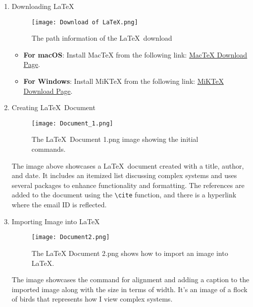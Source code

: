 \documentclass[12pt]{article}
\begin{document}
\begin{enumerate}

\item Downloading \LaTeX\ 

\begin{figure}[H]
    \centering
    \texttt{[image: Download of LaTeX.png]}
    \caption{The path information of the \LaTeX\ download}
    \label{fig:latex_download}
\end{figure}

\begin{itemize}
    \item \textbf{For macOS}: Install MacTeX from the following link: \href{https://tug.org/mactex/mactex-download.html}{MacTeX Download Page}.
    \item \textbf{For Windows}: Install MiKTeX from the following link: \href{https://miktex.org/download}{MiKTeX Download Page}.
\end{itemize}

\newpage
\item Creating \LaTeX\ Document

\begin{figure}[H]
    \centering
    \texttt{[image: Document\_1.png]}
    \caption{The \LaTeX\ Document 1.png image showing the initial commands.}
    \label{fig:latex_commands}
\end{figure}

The image above showcases a \LaTeX\ document created with a title, author, and date. It includes an itemized list discussing complex systems and uses several packages to enhance functionality and formatting. The references are added to the document using the \texttt{\textbackslash cite} function, and there is a hyperlink where the email ID is reflected.

\item Importing Image into \LaTeX

\begin{figure}[H]
    \centering
    \texttt{[image: Document2.png]}
    \caption{The LaTeX Document 2.png shows how to import an image into LaTeX.}
    \label{fig:latex_import_image}
\end{figure}

The image showcases the command for alignment and adding a caption to the imported image along with the size in terms of width. It's an image of a flock of birds that represents how I view complex systems.

\newpage


\end{enumerate}
\end{document}

